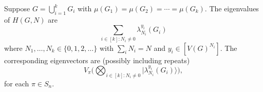 \documentclass[../thesis-main/thesis-main]{subfiles}
\begin{document}
\begin{lemma}
\label{lem:BH_disconnected_graphs}
Suppose $G=\bigcup_{i=1}^{k}G_{i}$ with $\mu(G_{1})=\mu(G_{2})=\cdots=\mu(G_{k})$. The eigenvalues of $H(G,N)$ are 
\begin{equation}
\sum_{i\in[k]\colon N_{i}\neq0}\lambda_{N_{i}}^{y_{i}}(G_{i})
\end{equation}
where $N_{1},\ldots,N_{k}\in\{0,1,2,\ldots\}$ with $\sum_{i}N_{i}=N$ and $y_{i}\in[V(G)^{N_i}].$ The corresponding eigenvectors are (possibly including repeats)
\begin{equation}
V_\pi\Bigg(\bigotimes_{i\in[k]\colon N_{i}\neq0}|\lambda_{N_{i}}^{y_{i}}(G_{i})\rangle\Bigg),
\label{eq:eigvecs_disconnected}
\end{equation}
for each $\pi \in S_n$.
\end{lemma}
\end{document}
